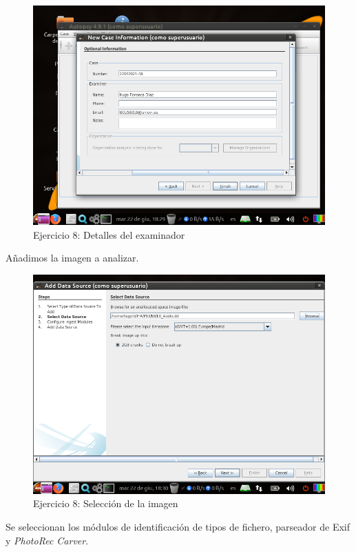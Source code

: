 \documentclass[11pt]{article}
\begin{document}
\begin{figure}[H]
    \caption{Ejercicio 8: Detalles del examinador}
    \centering
    \includegraphics[scale=0.7]{p03/e8-2.png}
\end{figure}

Añadimos la imagen a analizar.

\begin{figure}[H]
    \caption{Ejercicio 8: Selección de la imagen}
    \centering
    \includegraphics[scale=0.7]{p03/e8-3.png}
\end{figure}

Se seleccionan los módulos de identificación de tipos de fichero, parseador de Exif y \textit{PhotoRec Carver}.
\end{document}
